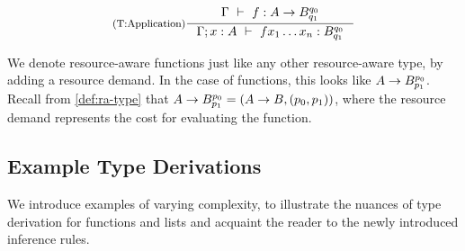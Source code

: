 \[
   \inference[(T:Application)]
   {\typing{\Gamma}{f}{A \to \ratype{B}{q_0}{q_1}}}
   {\typing{\Gamma;x:A}{f x_1 \dots x_n}{\ratype{B}{q_0}{q_1}}}
\]

\begin{remark}
   We denote resource-aware functions just like any other resource-aware type, by adding a resource demand. In the case of functions, this looks like \(A \to B ^{p_0}_{p_1}\). Recall from \cref{def:ra-type} that \(A \to B ^{p_0}_{p_1} = (A \to B, (p_0, p_1))\), where the resource demand represents the cost for evaluating the function.
\end{remark}

\subsection{Example Type Derivations}\label{sec:example-type-derivations}

We introduce examples of varying complexity, to illustrate the nuances of type derivation for functions and lists and acquaint the reader to the newly introduced inference rules.

